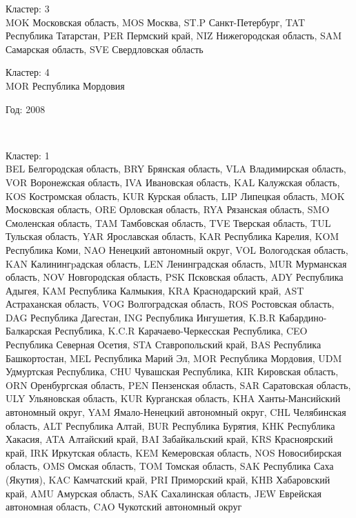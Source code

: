 \documentclass[11pt]{article}
\begin{document}
Кластер:  3 \\
MOK Московская область, MOS Москва, ST.P Санкт-Петербург, TAT Республика Татарстан, PER Пермский край, NIZ Нижегородская область, SAM Самарская область, SVE Свердловская область

Кластер:  4 \\
MOR Республика Мордовия

\begin{center}
Год:  2008
\end{center}


    \begin{center}
    \end{center}
    { \hspace*{\fill} \\}
    

Кластер:  1 \\
BEL Белгородская область, BRY Брянская область, VLA Владимирская область, VOR Воронежская область, IVA Ивановская область, KAL Калужская область, KOS Костромская область, KUR Курская область, LIP Липецкая область, MOK Московская область, ORE Орловская область, RYA Рязанская область, SMO Смоленская область, TAM Тамбовская область, TVE Тверская область, TUL Тульская область, YAR Ярославская область, KAR Республика Карелия, KOM Республика Коми, NAO Ненецкий автономный округ, VOL Вологодская область, KAN Калинингpадская область, LEN Ленинградская область, MUR Мурманская область, NOV Новгородская область, PSK Псковская область, ADY Республика Адыгея, KAM Республика Калмыкия, KRA Краснодарский край, AST Астраханская область, VOG Волгоградская область, ROS Ростовская область, DAG Республика Дагестан, ING Республика Ингушетия, K.B.R Кабардино-Балкарская Республика, K.C.R Карачаево-Черкесская Республика, CEO Республика Северная Осетия, STA Ставропольский край, BAS Республика Башкортостан, MEL Республика Марий Эл, MOR Республика Мордовия, UDM Удмуртская Республика, CHU Чувашская Республика, KIR Кировская область, ORN Оренбургская область, PEN Пензенская область, SAR Саратовская область, ULY Ульяновская область, KUR Курганская область, KHA Ханты-Мансийский автономный округ, YAM Ямало-Ненецкий автономный округ, CHL Челябинская область, ALT Республика Алтай, BUR Республика Бурятия, KHK Республика Хакасия, ATA Алтайский край, BAI Забайкальский край, KRS Красноярский край, IRK Иркутская область, KEM Кемеровская область, NOS Новосибирская область, OMS Омская область, TOM Томская область, SAK Республика Саха (Якутия), KAC Камчатский край, PRI Приморский край, KHB Хабаровский край, AMU Амурская область, SAK Сахалинская область, JEW Еврейская автономная область, CAO Чукотский автономный округ
\end{document}
